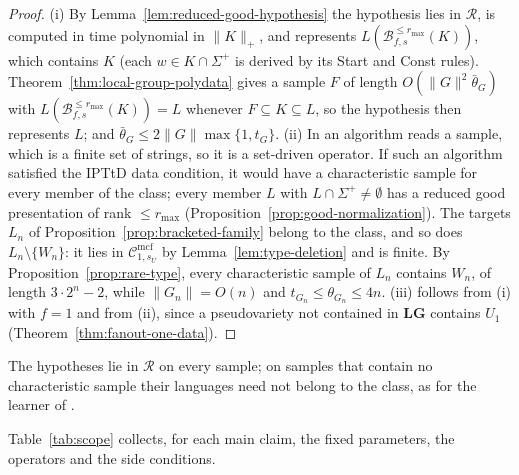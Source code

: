 \documentclass[11pt]{article}
\numberwithin{equation}{section}
\theoremstyle{plain}
\theoremstyle{definition}
\theoremstyle{remark}
\newcommand{\Cmcf}[2]{\mathcal{C}^{\mathrm{mcf}}_{#1,#2}}
\theoremstyle{plain}
\begin{document}
\begin{proof}
(i) By Lemma~\ref{lem:reduced-good-hypothesis} the hypothesis lies in
$\mathcal R$, is computed in time polynomial in $\|K\|_+$, and represents
$L(\mathcal B^{\le r_{\max}}_{f,s}(K))$, which contains $K$ (each $w\in K\cap\Sigma^+$
is derived by its Start and Const rules).
Theorem~\ref{thm:local-group-polydata} gives a sample $F$ of length
$O(\|G\|^2\bar\theta_G)$ with $L(\mathcal B^{\le r_{\max}}_{f,s}(K))=L$ whenever
$F\subseteq K\subseteq L$, so the hypothesis then represents $L$; and
$\bar\theta_G\le2\|G\|\max\{1,t_G\}$.
(ii) In \cite[Definition~2.12]{EyraudHeinzYoshinaka2016} an algorithm reads a
sample, which is a finite set of strings, so it is a set-driven operator.  If
such an algorithm satisfied the IPTtD data condition, it would have a
characteristic sample for every member of the class; every member $L$
with $L\cap\Sigma^+\ne\emptyset$ has a reduced good
presentation of rank $\le r_{\max}$ (Proposition~\ref{prop:good-normalization}).
The targets $L_n$ of Proposition~\ref{prop:bracketed-family} belong to the class,
and so does $L_n\setminus\{W_n\}$: it lies in $\Cmcf{1}{s_U}$ by
Lemma~\ref{lem:type-deletion} and is finite.  By
Proposition~\ref{prop:rare-type}, every characteristic sample of $L_n$ contains
$W_n$, of length $3\cdot2^n-2$, while $\|G_n\|=O(n)$ and $t_{G_n}\le\theta_{G_n}\le4n$.
(iii) follows from (i) with $f=1$ and from (ii), since a pseudovariety not
contained in $\mathbf{LG}$ contains $U_1$
(Theorem~\ref{thm:fanout-one-data}).
\end{proof}

The hypotheses lie in $\mathcal R$ on every sample; on samples that contain no
characteristic sample their languages need not belong to the class, as for the
learner of \cite{Yoshinaka2011}.

Table~\ref{tab:scope} collects, for each main claim, the fixed parameters,
the operators and the side conditions.
\end{document}

